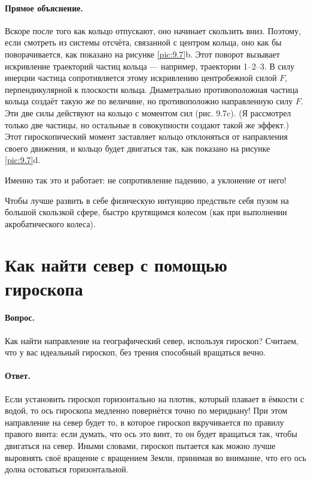 \paragraph{Прямое объяснение.}
Вскоре после того как кольцо отпускают, оно начинает скользить вниз.
Поэтому, если смотреть из системы отсчёта, связанной с центром кольца, оно как бы поворачивается, как показано на рисунке \ref{pic:9.7}b.
Этот поворот вызывает искривление траекторий частиц кольца --- например, траектории 1–2–3.
В силу инерции частица сопротивляется этому искривлению центробежной силой $F$, перпендикулярной к плоскости кольца.
Диаметрально противоположная частица кольца создаёт такую же по величине, но противоположно направленную силу $F$.
Эти две силы действуют на кольцо с моментом сил (рис. 9.7c).
(Я рассмотрел только две частицы, но остальные в совокупности создают такой же эффект.)
Этот гироскопический момент заставляет кольцо отклоняться от направления своего движения, и кольцо будет двигаться так, как показано на рисунке \ref{pic:9.7}d.

Именно так это и работает: не сопротивление падению, а уклонение от него!

Чтобы лучше развить в себе физическую интуицию
предствьте себя пузом на большой скользкой сфере, быстро крутящимся колесом (как при выполнении акробатического колеса).

\section{Как найти север с помощью гироскопа}

\paragraph{Вопрос.}
Как найти направление на географический север, используя гироскоп?
Считаем, что у вас идеальный гироскоп, без трения способный вращаться вечно.

\paragraph{Ответ.}
Если установить гироскоп горизонтально на плотик, который плавает в ёмкости с водой,
то ось гироскопа медленно повернётся точно по меридиану!
При этом направление на север будет то, в которое гироскоп вкручивается по правилу правого винта:
если думать, что ось это винт, то он будет вращаться так, чтобы двигаться на север.
Иными словами, гироскоп пытается как можно лучше выровнять своё вращение с вращением Земли, принимая во внимание, что его ось долна остоваться горизонтальной.

